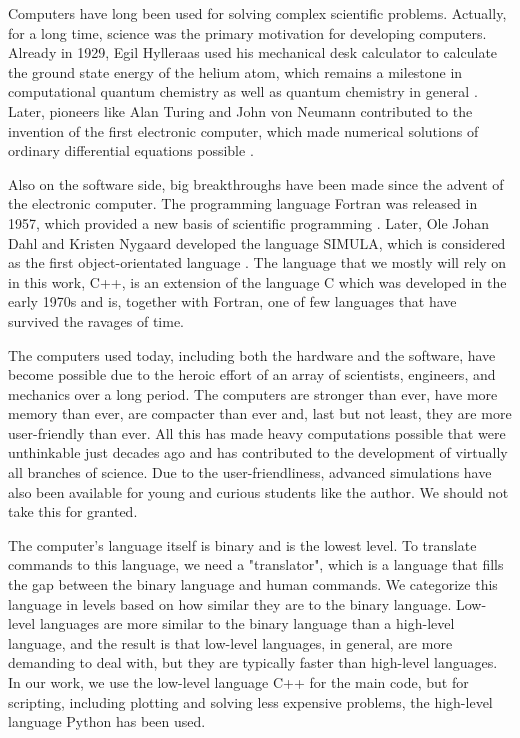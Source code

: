 Computers have long been used for solving complex scientific problems. Actually, for a long time, science was the primary motivation for developing computers. Already in 1929, Egil Hylleraas used his mechanical desk calculator to calculate the ground state energy of the helium atom, which remains a milestone in computational quantum chemistry as well as quantum chemistry in general \supercite{helgaker_perspective_2000}. Later, pioneers like Alan Turing and John von Neumann contributed to the invention of the first electronic computer, which made numerical solutions of ordinary differential equations possible \supercite{gustafsson_scientific_2018}. 

Also on the software side, big breakthroughs have been made since the advent of the electronic computer. The programming language Fortran was released in 1957, which provided a new basis of scientific programming \supercite{allen_history_1981}. Later, Ole Johan Dahl and Kristen Nygaard developed the language SIMULA, which is considered as the first object-orientated language \supercite{holmevik_compiling_1994}. The language that we mostly will rely on in this work, C++, is an extension of the language C which was developed in the early 1970s and is, together with Fortran, one of few languages that have survived the ravages of time. 

The computers used today, including both the hardware and the software, have become possible due to the heroic effort of an array of scientists, engineers, and mechanics over a long period. The computers are stronger than ever, have more memory than ever, are compacter than ever and, last but not least, they are more user-friendly than ever. All this has made heavy computations possible that were unthinkable just decades ago and has contributed to the development of virtually all branches of science. Due to the user-friendliness, advanced simulations have also been available for young and curious students like the author. We should not take this for granted. 

The computer's language itself is binary and is the lowest level. To translate commands to this language, we need a "translator", which is a language that fills the gap between the binary language and human commands. We categorize this language in levels based on how similar they are to the binary language. Low-level languages are more similar to the binary language than a high-level language, and the result is that low-level languages, in general, are more demanding to deal with, but they are typically faster than high-level languages. In our work, we use the low-level language C++ for the main code, but for scripting, including plotting and solving less expensive problems, the high-level language Python has been used. 

